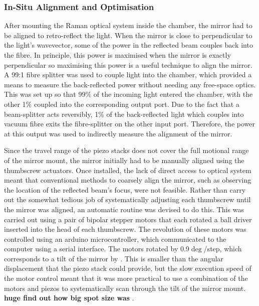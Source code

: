 \subsubsection{In-Situ Alignment and Optimisation}
After mounting the Raman optical system inside the chamber, the mirror had to be aligned to retro-reflect the light. When the mirror is close to perpendicular to the light's wavevector, some of the power in the reflected beam couples back into the fibre. In principle, this power is maximised when the mirror is exactly perpendicular so maximising this power is a useful technique to align the mirror. A 99:1 fibre splitter was used to couple light into the chamber, which provided a means to measure the back-reflected power without needing any free-space optics. This was set up so that 99\% of the incoming light entered the chamber, with the other 1\% coupled into the corresponding output port. Due to the fact that a beam-splitter acts reversibly, 1\% of the back-reflected light which couples into vacuum fibre exits the fibre-splitter on the other input port. Therefore, the power at this output was used to indirectly measure the alignment of the mirror. 
\par\noindent
Since the travel range of the piezo stacks does not cover the full motional range of the mirror mount, the mirror initially had to be manually aligned using the thumbscrew actuators. Once installed, the lack of direct access to optical system meant that conventional methods to coarsely align the mirror, such as observing the location of the reflected beam's focus, were not feasible. Rather than carry out the somewhat tedious job of systematically adjusting each thumbscrew until the mirror was aligned, an automatic routine was devised to do this. This was carried out using a pair of bipolar stepper motors that each rotated a ball driver inserted into the head of each thumbscrew. The revolution of these motors was controlled using an arduino microcontroller, which communicated to the computer using a serial interface. The motors rotated by 0.9\(\deg\)/step, which corresponds to a tilt of the mirror by . This is smaller than the  angular displacement that the piezo stack could provide, but the slow execution speed of the motor control meant that it was more practical to use a combination of the motors and piezos to systematically scan through the tilt of the mirror mount. 
{\textbf {huge find out how big spot size was }}. \par\noindent
